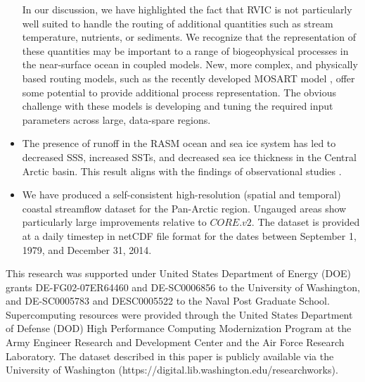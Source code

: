 \documentclass[jgrga, draft]{agutex}
\begin{document}
\begin{article}
\begin{itemize}[leftmargin=+.5in]
  In our discussion, we have highlighted the fact that RVIC is not particularly well suited to handle the routing of additional quantities such as stream temperature, nutrients, or sediments.
  We recognize that the representation of these quantities may be important to a range of biogeophysical processes in the near-surface ocean in coupled models.
  New, more complex, and physically based routing models, such as the recently developed MOSART model \citep{Li_2013}, offer some potential to provide additional process representation.
  The obvious challenge with these models is developing and tuning the required input parameters across large, data-spare regions.
  \item The presence of runoff in the RASM ocean and sea ice system has led to decreased SSS, increased SSTs, and decreased sea ice thickness in the Central Arctic basin.
  This result aligns with the findings of observational studies \citep[e.g.][]{Morison_2012}.
  \item We have produced a self-consistent high-resolution (spatial and temporal) coastal streamflow dataset for the Pan-Arctic region.
  Ungauged areas show particularly large improvements relative to $CORE.v2$.
  The dataset is provided at a daily timestep in netCDF file format for the dates between September 1, 1979, and December 31, 2014.
\end{itemize}


%
%
%


\begin{acknowledgments}
This research was supported under United States Department of Energy (DOE) grants DE-FG02-07ER64460 and DE-SC0006856 to the University of Washington, and DE-SC0005783 and DESC0005522 to the Naval Post Graduate School.
Supercomputing resources were provided through the United States Department of Defense (DOD) High Performance Computing Modernization Program at the Army Engineer Research and Development Center and the Air Force Research Laboratory.
The dataset described in this paper is publicly available via the University of Washington (https://digital.lib.washington.edu/researchworks).
\end{acknowledgments}


\end{article}
\end{document}
